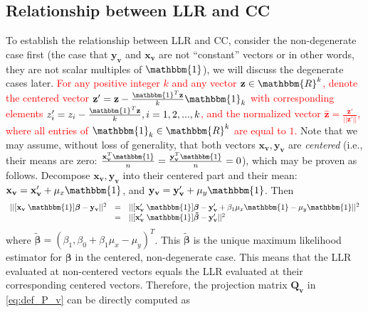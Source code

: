 \subsection{Relationship between LLR and CC}
To establish the relationship between LLR and CC, consider the non-degenerate case first (the case that $\mathbf{y}_{\mathbf{v}}$ and $\mathbf{x}_{\mathbf{v}}$ are not ``constant'' vectors or in other words, they are not scalar multiples of $\mathbbm{1}$), we will discuss the degenerate cases later. \textcolor{red}{For any positive integer $k$ and any vector $\mathbf{z}\in \mathbbm{R}^{k}$, denote the centered vector $\mathbf{z}' = \mathbf{z} - \frac{\mathbbm{1}^{T}\mathbf{z}}{k}\mathbbm{1}_{k}$ with corresponding elements $z_{i}'=z_{i} - \frac{\mathbbm{1}^{T}\mathbf{z}}{k}, i=1,2,...,k$, and the normalized vector $\widehat{\mathbf{z}} = \frac{\mathbf{z}'}{||\mathbf{z}'||}$, where all entries of $\mathbbm{1}_{k}\in \mathbbm{R}^{k}$ are equal to $1$.} Note that we may assume, without loss of generality, that both vectors $\mathbf{x}_{\mathbf{v}}, \mathbf{y}_{\mathbf{v}}$ are \emph{centered} (i.e., their means are zero: $\frac{\mathbf{x}_{\mathbf{v}}^{T}\mathbbm{1}}{n} = \frac{\mathbf{y}_{\mathbf{v}}^{T}\mathbbm{1}}{n} = 0$), which may be proven as follows. Decompose $\mathbf{x}_{\mathbf{v}}, \mathbf{y}_{\mathbf{v}}$ into their centered part and their mean: $\mathbf{x}_{\mathbf{v}} = \mathbf{x}_{\mathbf{v}}' + \mu_{x}\mathbbm{1}$, and $\mathbf{y}_{\mathbf{v}} = \mathbf{y}_{\mathbf{v}}' + \mu_{y}\mathbbm{1}$. Then
\begin{displaymath}
    \begin{array}{lcl}
        ||[\mathbf{x}_{\mathbf{v}} \; \mathbbm{1}]\boldsymbol{\beta} - \mathbf{y}_{\mathbf{v}}||^{2} &=& ||[\mathbf{x}_{\mathbf{v}}' \; \mathbbm{1}]\boldsymbol{\beta} - \mathbf{y}_{\mathbf{v}}' + \beta_{1}\mu_{x}\mathbbm{1} - \mu_{y}\mathbbm{1}||^{2}\\
        &=&||[\mathbf{x}_{\mathbf{v}}' \; \mathbbm{1}]\boldsymbol{\tilde{\beta}} - \mathbf{y}_{\mathbf{v}}'||^{2}
    \end{array}
\end{displaymath}
where $\boldsymbol{\tilde{\beta}} = (\beta_{1}, \beta_{0} + \beta_{1}\mu_{x} - \mu_{y})^{T}$. This $\boldsymbol{\tilde{\beta}}$ is the unique maximum likelihood estimator for $\boldsymbol{\beta}$ in the centered, non-degenerate case. This means that the LLR evaluated at non-centered vectors equals the LLR evaluated at their corresponding centered vectors. Therefore, the projection matrix $\mathbf{Q}_{\mathbf{v}}$ in \eqref{eq:def_P_v} can be directly computed as

